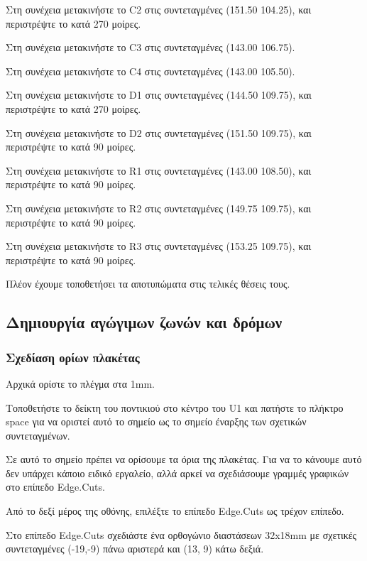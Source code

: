 \documentclass[a4paper]{article}
\begin{document}

Στη συνέχεια μετακινήστε το C2 στις συντεταγμένες (151.50 104.25), και περιστρέψτε το κατά 270 μοίρες. 

Στη συνέχεια μετακινήστε το C3 στις συντεταγμένες (143.00 106.75).

Στη συνέχεια μετακινήστε το C4 στις συντεταγμένες (143.00 105.50).

Στη συνέχεια μετακινήστε το D1 στις συντεταγμένες (144.50 109.75), και περιστρέψτε το κατά 270 μοίρες. 

Στη συνέχεια μετακινήστε το D2 στις συντεταγμένες (151.50 109.75), και περιστρέψτε το κατά  90 μοίρες. 

Στη συνέχεια μετακινήστε το R1 στις συντεταγμένες (143.00 108.50), και περιστρέψτε το κατά  90 μοίρες. 

Στη συνέχεια μετακινήστε το R2 στις συντεταγμένες (149.75 109.75), και περιστρέψτε το κατά  90 μοίρες. 

Στη συνέχεια μετακινήστε το R3 στις συντεταγμένες (153.25 109.75), και περιστρέψτε το κατά  90 μοίρες. 

Πλέον έχουμε τοποθετήσει τα αποτυπώματα στις τελικές θέσεις τους.
 

\subsection{Δημιουργία αγώγιμων ζωνών και δρόμων}

\subsubsection{Σχεδίαση ορίων πλακέτας}
Αρχικά ορίστε το πλέγμα στα 1mm.

Τοποθετήστε το δείκτη του ποντικιού στο κέντρο του U1 και πατήστε το πλήκτρο space για να οριστεί αυτό το σημείο ως το σημείο έναρξης των σχετικών συντεταγμένων.

Σε αυτό το σημείο πρέπει να ορίσουμε τα όρια της πλακέτας. Για να το κάνουμε αυτό δεν υπάρχει κάποιο ειδικό εργαλείο, αλλά αρκεί να σχεδιάσουμε γραμμές γραφικών στο επίπεδο Edge.Cuts.

Από το δεξί μέρος της οθόνης, επιλέξτε το επίπεδο Edge.Cuts ως τρέχον επίπεδο. 

Στο επίπεδο Edge.Cuts σχεδιάστε ένα ορθογώνιο διαστάσεων 32x18mm με σχετικές συντεταγμένες (-19,-9) πάνω αριστερά και (13, 9) κάτω δεξιά. 
\end{document}
